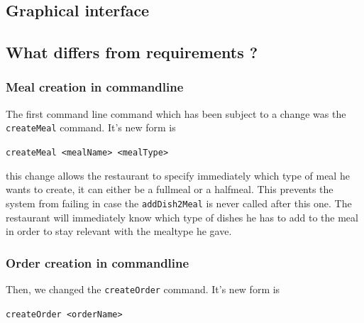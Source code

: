
\subsection{Graphical interface} %
\label{sub:graphical_interface}


\subsection{What differs from requirements ?} %
\label{sub:what_differs_from_requirements}

\subsubsection{Meal creation in commandline} %
\label{ssub:meal_creation_in_commandline}
The first command line command which has been subject to a change
was the \lstinline|createMeal| command. It's new form is
\begin{center}
  \lstinline|createMeal <mealName> <mealType>|
\end{center}
this change allows the restaurant to specify immediately which type of meal
he wants to create, it can either be a fullmeal or a halfmeal.
This prevents the system from failing in case the \lstinline|addDish2Meal|
is never called after this one.
The restaurant will immediately know which type of dishes he has to add
to the meal in order to stay relevant with the mealtype he gave. 


\subsubsection{Order creation in commandline} %
\label{ssub:order_creation_in_commandline}
Then, we changed the \lstinline|createOrder| command. It's new form is
\begin{center}
  \lstinline|createOrder <orderName>|
\end{center}



